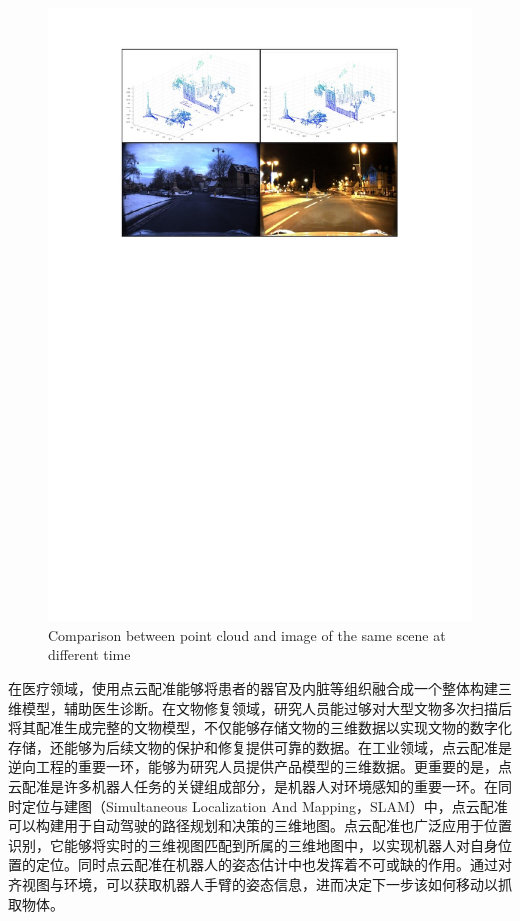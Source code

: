 \vspace{-0.1cm}
\begin{figure}[h]
    \centering 
    \includegraphics[width=\textwidth]{my/figure/1-1.pdf}
    {\wuhao Comparison between point cloud and image of the same scene at different time}
    \label{fig：1-1} 
\end{figure}
\vspace{-0.35cm}

在医疗领域，使用点云配准能够将患者的器官及内脏等组织融合成一个整体构建三维模型，辅助医生诊断。在文物修复领域，研究人员能过够对大型文物多次扫描后将其配准生成完整的文物模型，不仅能够存储文物的三维数据以实现文物的数字化存储，还能够为后续文物的保护和修复提供可靠的数据。在工业领域，点云配准是逆向工程的重要一环，能够为研究人员提供产品模型的三维数据。更重要的是，点云配准是许多机器人任务的关键组成部分，是机器人对环境感知的重要一环。在同时定位与建图（Simultaneous Localization And Mapping，SLAM）中，点云配准可以构建用于自动驾驶的路径规划和决策的三维地图。点云配准也广泛应用于位置识别，它能够将实时的三维视图匹配到所属的三维地图中，以实现机器人对自身位置的定位。同时点云配准在机器人的姿态估计中也发挥着不可或缺的作用。通过对齐视图与环境，可以获取机器人手臂的姿态信息，进而决定下一步该如何移动以抓取物体。

